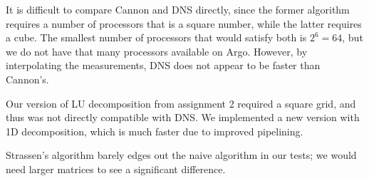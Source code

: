 \documentclass{article}
\begin{document}
It is difficult to compare Cannon and DNS directly, since the former algorithm requires a number of processors
 that is a square number, while the latter requires a cube. The smallest number of processors that would satisfy both is $2^6 = 64$, but we do not have
 that many processors available on Argo. However, by interpolating the measurements, DNS does not appear to be faster than Cannon's.

Our version of LU decomposition from assignment 2 required a square grid, and thus was not directly compatible with DNS. We implemented a new version with
1D decomposition, which is much faster due to improved pipelining.

Strassen's algorithm barely edges out the naive algorithm in our tests; we would need larger matrices to see a significant difference.


% 
% 
% 


\newpage
~


% 
% 
% 
% 
% 
% 
% 
\end{document}
